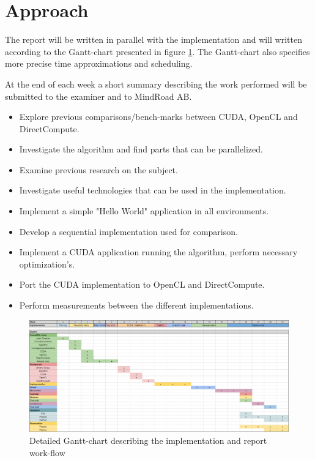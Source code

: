 \documentclass{article}
\begin{document}
\section{Approach}
The report will be written in parallel with the implementation and will written according to the Gantt-chart presented in figure \ref{fig:GanttChart}. The Gantt-chart also specifies more precise time approximations and scheduling.

At the end of each week a short summary describing the work performed will be submitted to the examiner and to MindRoad AB.

\begin{itemize}
    \item Explore previous comparisons/bench-marks between CUDA, OpenCL and DirectCompute. 
    \item Investigate the algorithm and find parts that can be parallelized.
    \item Examine previous research on the subject.
    \item Investigate useful technologies that can be used in the implementation.
    \item Implement a simple "Hello World" application in all environments.
    \item Develop a sequential implementation used for comparison.
    \item Implement a CUDA application running the algorithm, perform necessary optimization's.
    \item Port the CUDA implementation to OpenCL and DirectCompute.
    \item Perform measurements between the different implementations.
\end{itemize}


\begin{figure}
    \centering
    \includegraphics[width=1.1\textwidth]{Figs/Gantt-chart.png}
    \caption{Detailed Gantt-chart describing the implementation and report work-flow}
    \label{fig:GanttChart}
\end{figure}
\end{document}
